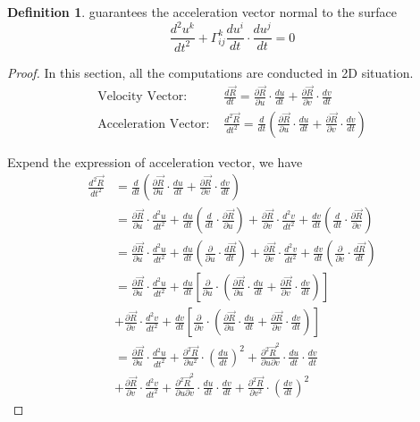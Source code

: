 \documentclass[a4paper]{article}
\theoremstyle{definition}
\newtheorem{definition}{Definition}
\theoremstyle{plain}
\begin{document}
\begin{definition}
 guarantees the acceleration vector normal to the surface
\begin{equation*}
    \frac{d^2u^k}{dt^2}+\Gamma_{ij}^k\frac{du^i}{dt}\cdot\frac{du^j}{dt}=0
\end{equation*}
\end{definition}

\begin{proof}
In this section, all the computations are conducted in 2D situation.
\begin{align*}
    \text{Velocity Vector: }&\frac{d\vec{R}}{dt}=\frac{\partial\vec{R}}{\partial u}\cdot\frac{du}{dt}+\frac{\partial\vec{R}}{\partial v}\cdot\frac{dv}{dt}\\
    \text{Acceleration Vector: }&\frac{d^2\vec{R}}{dt^2}=\frac{d}{dt}\left(\frac{\partial\vec{R}}{\partial u}\cdot\frac{du}{dt}+\frac{\partial\vec{R}}{\partial v}\cdot\frac{dv}{dt}\right)
\end{align*}

Expend the expression of acceleration vector, we have
\begin{align*}
    \frac{d^2\vec{R}}{d t^2}&=\frac{d}{dt}\left(\frac{\partial\vec{R}}{\partial u}\cdot\frac{du}{dt}+\frac{\partial\vec{R}}{\partial v}\cdot\frac{dv}{dt}\right)\\
    &=\frac{\partial\vec{R}}{\partial u}\cdot\frac{d^2u}{dt^2}+\frac{du}{dt}\left(\frac{d}{dt}\cdot\frac{\partial\vec{R}}{\partial u}\right)+\frac{\partial\vec{R}}{\partial v}\cdot\frac{d^2v}{dt^2}+\frac{dv}{dt}\left(\frac{d}{dt}\cdot\frac{\partial\vec{R}}{\partial v}\right)\\
    &=\frac{\partial\vec{R}}{\partial u}\cdot\frac{d^2u}{dt^2}+\frac{du}{dt}\left(\frac{\partial}{\partial u}\cdot\frac{d\vec{R}}{d t}\right)+\frac{\partial\vec{R}}{\partial v}\cdot\frac{d^2v}{dt^2}+\frac{dv}{dt}\left(\frac{\partial}{\partial v}\cdot\frac{d\vec{R}}{dt}\right)\\
    &=\frac{\partial\vec{R}}{\partial u}\cdot\frac{d^2u}{dt^2}+\frac{du}{dt}\left[\frac{\partial}{\partial u}\cdot\left(\frac{\partial\vec{R}}{\partial u}\cdot\frac{du}{dt}+\frac{\partial\vec{R}}{\partial v}\cdot\frac{dv}{dt}\right)\right]\\
    &+\frac{\partial\vec{R}}{\partial v}\cdot\frac{d^2v}{dt^2}+\frac{dv}{dt}\left[\frac{\partial}{\partial v}\cdot\left(\frac{\partial\vec{R}}{\partial u}\cdot\frac{du}{dt}+\frac{\partial\vec{R}}{\partial v}\cdot\frac{dv}{dt}\right)\right]\\
    &=\frac{\partial \vec{R}}{\partial u}\cdot\frac{d^2 u}{d t^2}+\frac{\partial^2\vec{R}}{\partial u^2}\cdot\left(\frac{du}{dt}\right)^2+\frac{\partial^2\vec{R}^2}{\partial u\partial v}\cdot\frac{du}{dt}\cdot\frac{dv}{dt}\\
    &+\frac{\partial \vec{R}}{\partial v}\cdot\frac{d^2 v}{d t^2}+\frac{\partial^2\vec{R}^2}{\partial u\partial v}\cdot\frac{du}{dt}\cdot\frac{dv}{dt}+\frac{\partial^2\vec{R}}{\partial v^2}\cdot\left(\frac{dv}{dt}\right)^2
\end{align*}


\end{proof}
\end{document}

